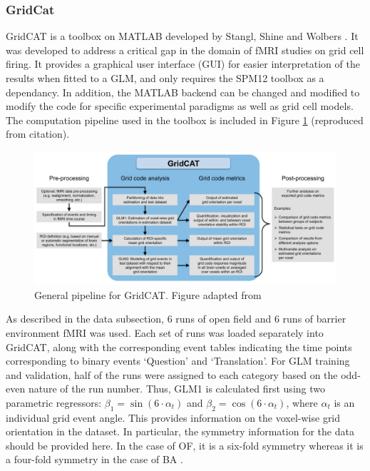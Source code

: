 \documentclass[a4paper]{article}
\begin{document}
\subsubsection{\textbf{GridCat}}

\noindent GridCAT is a toolbox on MATLAB developed by Stangl, Shine and Wolbers \cite{stangl_gridcat_2017}. It was developed to address a critical gap in the domain of fMRI studies on grid cell firing. It provides a graphical user interface (GUI) for easier interpretation of the results when fitted to a GLM, and only requires the SPM12 toolbox as a dependancy. In addition, the MATLAB backend can be changed and modified to modify the code for specific experimental paradigms as well as grid cell models. The computation pipeline used in the toolbox is included in Figure \ref{fig:gridcat_intro} (reproduced from citation). \\

\begin{figure}
    \centering
    \includegraphics[width=0.8\linewidth]{gridcat_tabular.png}
    \caption{General pipeline for GridCAT. Figure adapted from \cite{stangl_gridcat_2017}}
    \label{fig:gridcat_intro}
\end{figure}

\noindent As described in the data subsection, 6 runs of open field and 6 runs of barrier environment fMRI was used. Each set of runs was loaded separately into GridCAT, along with the corresponding event tables indicating the time points corresponding to binary events ‘Question’ and ‘Translation’. For GLM training and validation, half of the runs were assigned to each category based on the odd-even nature of the run number. Thus, GLM1 is calculated first using two parametric regressors:  $ \beta_1 = \sin(6 \cdot \alpha_t)$ and  $\beta_2 = \cos(6 \cdot \alpha_t)$, where $\alpha_t$ is an individual grid event angle. This provides information on the voxel-wise grid orientation in the dataset. In particular, the symmetry information for the data should be provided here. In the case of OF, it is a six-fold symmetry whereas it is a four-fold symmetry in the case of BA \cite{he_environmental_2019}. \\
\end{document}
